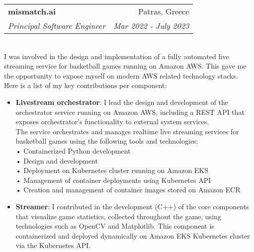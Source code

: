 \documentclass[letterpaper,10pt]{article}
\makeatletter
\newcommand{\resumeItem}[2]{
  \item\small{
    \textbf{#1}{: #2 \vspace{-2pt}}
  }
}
\newcommand{\resumeSubheading}[4]{
  \vspace{-1pt}\item
    \begin{tabular*}{0.97\textwidth}[t]{l@{\extracolsep{\fill}}r}
      \textbf{#1} & #2 \\
      \textit{\small#3} & \textit{\small #4} \\
    \end{tabular*}\vspace{-5pt}
}
\newcommand{\resumeItemListStart}{\begin{itemize}}
\newcommand{\resumeItemListEnd}{\end{itemize}\vspace{-5pt}}
\makeatother
\begin{document}
    \resumeSubheading
    {mismatch.ai}{Patras, Greece}
    {Principal Software Engineer}{Mar 2022 - July 2023}
    \newline \\I was involved in the design and implementation of a fully automated live streaming service for basketball games running on Amazon AWS. This gave me the opportunity to expose myself on modern AWS related technology stacks.\\
    Here is a list of my key contributions per component:
    \resumeItemListStart
      \resumeItem{Livestream orchestrator}
        {I lead the design and development of the orchestrator service running on Amazon AWS, including a REST API that exposes orchestrator's functionality to external system services.\\
        The service orchestrates and manages realtime live streaming services for basketball games using the following tools and technologies:\\
        • Containerized Python development\\
        • Design and development\\
        • Deployment on Kubernetes cluster running on Amazon EKS\\
        • Management of container deployments using Kubernetes API\\
        • Creation and management of container images stored on Amazon ECR\\
        }
      \resumeItem{Streamer}
        {I contributed in the development (C++) of the core components that visualize game statistics, collected throughout the game, using technologies such as OpenCV and Matplotlib. This component is containerized and deployed dynamically on Amazon EKS Kubernetes cluster via the Kubernetes API.
        }
    \resumeItemListEnd
\end{document}
